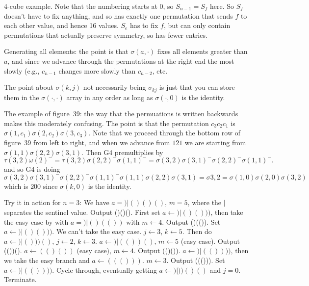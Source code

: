  4-cube example.\hfil\break
Note that the numbering starts at 0, so $S_{n-1} = S_f$ here.  So $S_f$
doesn't have to fix anything, and so has exactly one permutation that sends
$f$ to each other value, and hence 16 values.  $S_e$ has to fix $f$, but
can only contain permutations that actually preserve symmetry, so has
fewer entries.

 Generating all elements: the point is that 
$\sigma\left(a, \cdot\right)$ fixes all elements greater than $a$,
and since we advance through the permutations at the right end
the most slowly (e.g., $c_{n-1}$ changes more slowly than $c_{n-2}$,
etc.


\noindent [p 328] The point about $\sigma\left(k, j\right)$ not
necessarily being $\sigma_{kj}$ is just that you can store them in
the $\sigma\left(\cdot, \cdot\right)$ array in any order as long
as $\sigma\left(\cdot, 0\right)$ is the identity.

 The example of figure~39: the way that the
permuations is written backwards makes this moderately confusing.
The point is that the permutation $c_3 c_2 c_1$ is
$\sigma\left(1, c_1\right) \sigma\left(2, c_2\right) \sigma\left(3, c_3\right)$.
Note that we proceed through the bottom row of figure~39 from left
to right, and when we advance from $121$ we are starting from
$\sigma\left(1, 1\right) \sigma\left(2, 2\right) \sigma\left(3, 1\right)$.
Then G4 premultiplies by 
$$
 \tau\left(3, 2\right) \omega\left(2\right)^{-} = 
  \tau\left(3, 2\right) \sigma\left(2, 2\right)^{-} \sigma\left(1, 1\right)^{-} =
  \sigma\left(3, 2\right) \sigma\left(3, 1\right)^{-} \sigma\left(2, 2\right)^{-} 
  \sigma\left(1, 1\right)^{-} .
$$
and so G4 is doing 
$$
\sigma\left(3, 2\right) \sigma\left(3, 1\right)^{-} \sigma\left(2, 2\right)^{-} 
  \sigma\left(1, 1\right)^{-} \sigma\left(1, 1\right) \sigma\left(2, 2\right) \sigma\left(3, 1\right)
  = \sigma{3, 2} = \sigma\left(1, 0\right) \sigma\left(2, 0\right) \sigma\left(3, 2\right)
$$
which is $200$ since $\sigma\left(k, 0\right)$ is the identity.
 


 \hfil\break
Try it in action for $n=3$:
 We have $a = ) \vert ()()()$, $m = 5$, where the $\vert$
separates the sentinel value.
 Output ()()().
 First set $a \gets ) \vert ()()))$, then take the easy
case by with $a = ) \vert ()(())$ with $m \gets 4$.
 Output ()(()).
 Set $a \gets ) \vert ()()))$.  We can't take the easy case.
 $j \gets 3$, $k \gets 5$.  Then do $a \gets ) \vert ()))()$,
$j \gets 2$, $k \gets 3$.
 $a \gets ) \vert (())()$, $m \gets 5$ (easy case).
 Output (())().
 $a \gets (()())$ (easy case), $m \gets 4$.
 Output (()()).
 $a \gets ) \vert (())))$, then we take the easy branch and
 $a \gets ((()))$. $m \gets 3$.
 Output ((())).
 Set $a \gets ) \vert (())))$.
 Cycle through, eventually getting $a \gets ) \vert ))()()$ and
 $j = 0$.
 Terminate.

